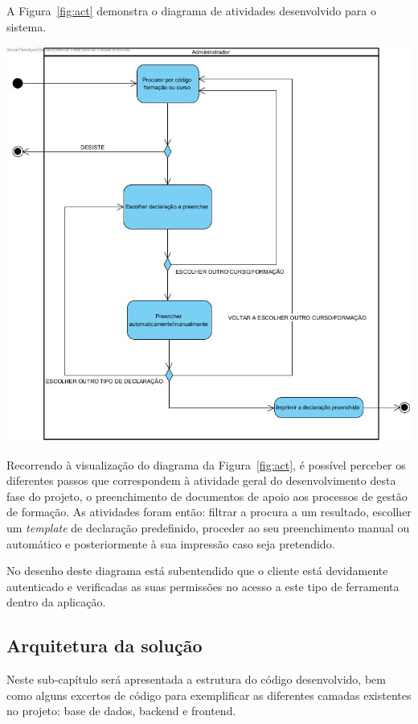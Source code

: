 A Figura~\ref{fig:act} demonstra o diagrama de atividades desenvolvido para o sistema.

\begin{center}
        \includegraphics[width=\textwidth,height=\textheight,keepaspectratio]{images/ActivityDiagram1.jpg}
        \label{fig:act}
\end{center}

Recorrendo à visualização do diagrama da Figura~\ref{fig:act}, é possível perceber os diferentes passos que correspondem à atividade geral do desenvolvimento desta fase do projeto, o preenchimento de documentos de apoio aos processos de gestão de formação. As atividades foram então: filtrar a procura a um resultado, escolher um \textit{template} de declaração predefinido, proceder ao seu preenchimento manual ou automático e posteriormente à sua impressão caso seja pretendido.

No desenho deste diagrama está subentendido que o cliente está devidamente autenticado e verificadas as suas permissões no acesso a este tipo de ferramenta dentro da aplicação.

\subsection{Arquitetura da solução}
Neste sub-capítulo será apresentada a estrutura do código desenvolvido, bem como alguns excertos de código para exemplificar as diferentes camadas existentes no projeto: base de dados, \gls{backend} e \gls{frontend}.

